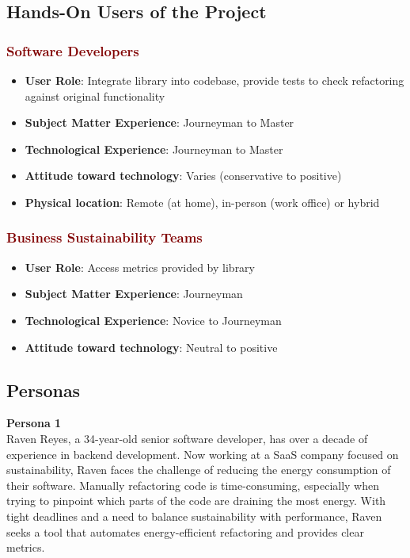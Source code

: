 \documentclass[12pt]{article}
\begin{document}
\subsection{Hands-On Users of the Project}
\subsubsection*{\textcolor{Maroon}{Software Developers}}
\begin{itemize}
  \item \textbf{User Role}: Integrate library into codebase, provide tests to check refactoring against original functionality

  \item \textbf{Subject Matter Experience}: Journeyman to Master
  
  \item \textbf{Technological Experience}: Journeyman to Master
  
  \item \textbf{Attitude toward technology}: Varies (conservative to positive)
  
  \item \textbf{Physical location}: Remote (at home), in-person (work office) or hybrid
\end{itemize}

\subsubsection*{\textcolor{Maroon}{Business Sustainability Teams}}
\begin{itemize}
  \item \textbf{User Role}: Access metrics provided by library

  \item \textbf{Subject Matter Experience}: Journeyman

  \item \textbf{Technological Experience}: Novice to Journeyman
  
  \item \textbf{Attitude toward technology}: Neutral to positive

\end{itemize}

\subsection{Personas}

\textbf{Persona 1} \\
Raven Reyes, a 34-year-old senior software developer, has over a decade of experience in backend development. Now working at a SaaS company focused on sustainability, Raven faces the challenge of reducing the energy consumption of their software. Manually refactoring code is time-consuming, especially when trying to pinpoint which parts of the code are draining the most energy. With tight deadlines and a need to balance sustainability with performance, Raven seeks a tool that automates energy-efficient refactoring and provides clear metrics. \\
\end{document}
